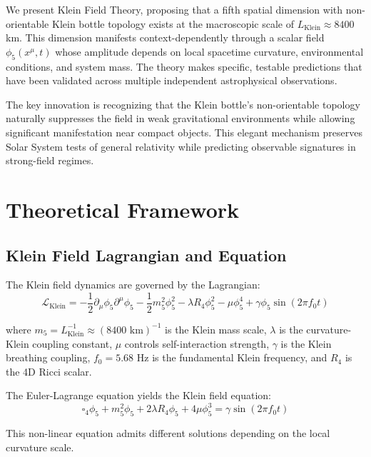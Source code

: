 \documentclass[12pt]{iopart}
\begin{document}
We present Klein Field Theory, proposing that a fifth spatial dimension with non-orientable Klein bottle topology exists at the macroscopic scale of $L_{\text{Klein}} \approx 8400$ km. This dimension manifests context-dependently through a scalar field $\phi_5(x^\mu, t)$ whose amplitude depends on local spacetime curvature, environmental conditions, and system mass. The theory makes specific, testable predictions that have been validated across multiple independent astrophysical observations.

The key innovation is recognizing that the Klein bottle's non-orientable topology naturally suppresses the field in weak gravitational environments while allowing significant manifestation near compact objects. This elegant mechanism preserves Solar System tests of general relativity while predicting observable signatures in strong-field regimes.

\section{Theoretical Framework}

\subsection{Klein Field Lagrangian and Equation}

The Klein field dynamics are governed by the Lagrangian:
\begin{equation}
\mathcal{L}_{\text{Klein}} = -\frac{1}{2} \partial_\mu\phi_5 \partial^\mu\phi_5 - \frac{1}{2}m_5^2\phi_5^2 - \lambda R_4\phi_5^2 - \mu\phi_5^4 + \gamma\phi_5 \sin(2\pi f_0 t)
\label{eq:klein_lagrangian}
\end{equation}

where $m_5 = L_{\text{Klein}}^{-1} \approx (8400 \text{ km})^{-1}$ is the Klein mass scale, $\lambda$ is the curvature-Klein coupling constant, $\mu$ controls self-interaction strength, $\gamma$ is the Klein breathing coupling, $f_0 = 5.68$ Hz is the fundamental Klein frequency, and $R_4$ is the 4D Ricci scalar.

The Euler-Lagrange equation yields the Klein field equation:
\begin{equation}
\boxed{\square_4\phi_5 + m_5^2\phi_5 + 2\lambda R_4\phi_5 + 4\mu\phi_5^3 = \gamma \sin(2\pi f_0 t)}
\label{eq:klein_field_equation}
\end{equation}

This non-linear equation admits different solutions depending on the local curvature scale.
\end{document}
